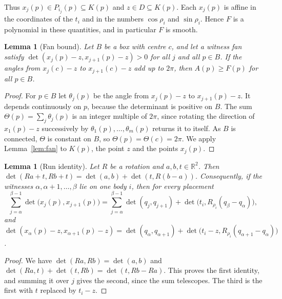 \documentclass[11pt]{amsart}
\newtheorem{lemma}[theorem]{Lemma}
\theoremstyle{definition}
\theoremstyle{remark}
\numberwithin{equation}{section}
\newcommand{\R}{\mathbb{R}}
\begin{document}
Thus $x_j(p)\in P_{i_j}(p)\subseteq K(p)$ and $z\in D\subseteq K(p)$. Each $x_j(p)$ is affine in the coordinates of the $t_i$ and in the numbers $\cos\rho_i$ and $\sin\rho_i$. Hence $F$ is a polynomial in these quantities, and in particular $F$ is smooth.

\begin{lemma}[Fan bound]\label{lem:fanbox}
Let $B$ be a box with centre $c$, and let a witness fan satisfy $\det(x_j(p)-z,x_{j+1}(p)-z)>0$ for all $j$ and all $p\in B$. If the angles from $x_j(c)-z$ to $x_{j+1}(c)-z$ add up to $2\pi$, then $A(p)\ge F(p)$ for all $p\in B$.
\end{lemma}

\begin{proof}
For $p\in B$ let $\theta_j(p)$ be the angle from $x_j(p)-z$ to $x_{j+1}(p)-z$. It depends continuously on $p$, because the determinant is positive on $B$. The sum $\Theta(p)=\sum_j\theta_j(p)$ is an integer multiple of $2\pi$, since rotating the direction of $x_1(p)-z$ successively by $\theta_1(p),\dots,\theta_m(p)$ returns it to itself. As $B$ is connected, $\Theta$ is constant on $B$, so $\Theta(p)=\Theta(c)=2\pi$. We apply Lemma~\ref{lem:fan} to $K(p)$, the point $z$ and the points $x_j(p)$.
\end{proof}

\begin{lemma}[Run identity]\label{lem:run}
Let $R$ be a rotation and $a,b,t\in\R^2$. Then $\det(Ra+t,Rb+t)=\det(a,b)+\det(t,R(b-a))$. Consequently, if the witnesses $\alpha,\alpha+1,\dots,\beta$ lie on one body $i$, then for every placement
\[
\sum_{j=\alpha}^{\beta-1}\det\bigl(x_j(p),x_{j+1}(p)\bigr)=\sum_{j=\alpha}^{\beta-1}\det(q_j,q_{j+1})+\det\bigl(t_i,R_{\rho_i}(q_\beta-q_\alpha)\bigr),
\]
and $\det(x_\alpha(p)-z,x_{\alpha+1}(p)-z)=\det(q_\alpha,q_{\alpha+1})+\det\bigl(t_i-z,R_{\rho_i}(q_{\alpha+1}-q_\alpha)\bigr)$.
\end{lemma}

\begin{proof}
We have $\det(Ra,Rb)=\det(a,b)$ and $\det(Ra,t)+\det(t,Rb)=\det(t,Rb-Ra)$. This proves the first identity, and summing it over $j$ gives the second, since the sum telescopes. The third is the first with $t$ replaced by $t_i-z$.
\end{proof}
\end{document}
